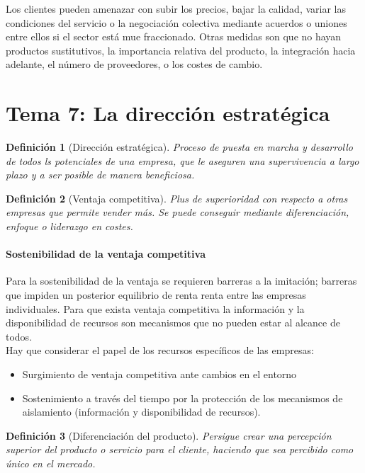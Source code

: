 \documentclass[12pt]{article}
\theoremstyle{definition_wo_parentheses}
\newtheorem{definicion}{Definición}[section]
\begin{document}
Los clientes pueden amenazar con subir los precios, bajar la calidad, variar las condiciones del servicio o la negociación colectiva mediante acuerdos o uniones entre ellos si el sector está mue fraccionado. Otras medidas son que no hayan productos sustitutivos, la importancia relativa del producto, la integración hacia adelante, el número de proveedores, o los costes de cambio.

\section{Tema 7: La dirección estratégica}

\begin{definicion}[Dirección estratégica]
	Proceso de puesta en marcha y desarrollo de todos ls potenciales de una empresa, que le aseguren una supervivencia a largo plazo y a ser posible de manera beneficiosa. 
\end{definicion}

\begin{definicion}[Ventaja competitiva]
	Plus de superioridad con respecto a otras empresas que permite vender más. Se puede conseguir mediante diferenciación, enfoque o liderazgo en costes.
\end{definicion}

\paragraph{Sostenibilidad de la ventaja competitiva} Para la sostenibilidad de la ventaja se requieren barreras a la imitación; barreras que impiden un posterior equilibrio de renta renta entre las empresas individuales. Para que exista ventaja competitiva la información y la disponibilidad de recursos son mecanismos que no pueden estar al alcance de todos. \\

Hay que considerar el papel de los recursos específicos de las empresas: 
\begin{itemize}
\item Surgimiento de ventaja competitiva ante cambios en el entorno
\item Sostenimiento a través del tiempo por la protección de los mecanismos de aislamiento (información y disponibilidad de recursos).
\end{itemize}

\begin{definicion}[Diferenciación del producto]
Persigue crear una percepción superior del producto o servicio para el cliente, haciendo que sea percibido como único en el mercado.
\end{definicion}
\end{document}
